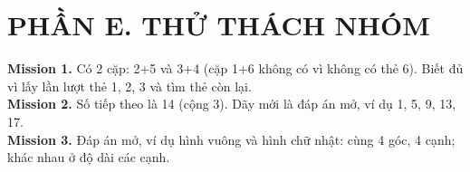 \documentclass[11pt,a4paper]{article}
\begin{document}
\section*{PHẦN E. THỬ THÁCH NHÓM}
\textbf{Mission 1.} Có 2 cặp: 2+5 và 3+4 (cặp 1+6 không có vì không có thẻ 6). Biết đủ vì lấy lần lượt thẻ 1, 2, 3 và tìm thẻ còn lại.\\
\textbf{Mission 2.} Số tiếp theo là 14 (cộng 3). Dãy mới là đáp án mở, ví dụ 1, 5, 9, 13, 17.\\
\textbf{Mission 3.} Đáp án mở, ví dụ hình vuông và hình chữ nhật: cùng 4 góc, 4 cạnh; khác nhau ở độ dài các cạnh.
\end{document}
